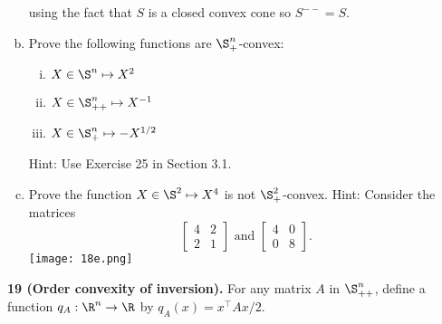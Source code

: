 \documentclass[../borwein-lewis_notes.tex]{subfiles}
\begin{document}
\begin{enumerate}[(a), resume]
{using the fact that $S$ is a closed convex cone so $S^{--}=S$.
}
\item Prove the following functions are $\S_+^n$-convex: 
\begin{enumerate}[(i)]
\item $X\in\S^n\mapsto X^2$
\item $X\in \S_{++}^n\mapsto X^{-1}$
\item $X\in\S_+^n\mapsto -X^{1/2}$
\end{enumerate}
Hint: Use Exercise 25 in Section 3.1. \\
\item Prove the function $X\in\S^2\mapsto X^4$ is not $\S_+^2$-convex. 
Hint: Consider the matrices 
\begin{equation*}
\begin{bmatrix} 4 & 2\\ 2 & 1 \end{bmatrix}
\text{ and } \begin{bmatrix} 4&0 \\ 0 & 8\end{bmatrix}.
\end{equation*}
\texttt{[image: 18e.png]}
\end{enumerate}
\textbf{19 (Order convexity of inversion).} For any matrix $A$ in 
$\S_{++}^n$, define a function $q_A:\R^n\to\R$ by $q_A(x) = x^\top A 
x/2$.
\end{document}
